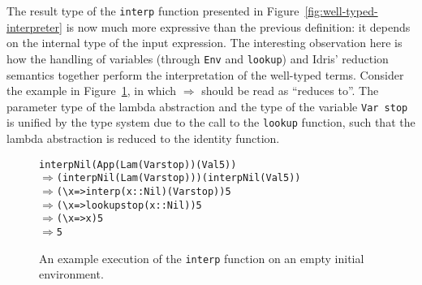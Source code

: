 The result type of the \texttt{interp} function presented in Figure~\ref{fig:well-typed-interpreter} is now much more expressive than the previous definition: it depends on the internal type of the input expression. The interesting observation here is how the handling of variables (through \texttt{Env} and \texttt{lookup}) and Idris' reduction semantics together perform the interpretation of the well-typed terms. Consider the example in Figure~\ref{fig:well-typed-interpreter-example}, in which $\Rightarrow$ should be read as ``reduces to''. The parameter type of the lambda abstraction and the type of the variable \texttt{Var stop} is unified by the type system due to the call to the \texttt{lookup} function, such that the lambda abstraction is reduced to the identity function.

\begin{figure}
\begin{alltt}
interp Nil (App (Lam (Var stop)) (Val 5))
\(\Rightarrow\) (interp Nil (Lam (Var stop))) (interp Nil (Val 5))
\(\Rightarrow\) (\textbackslash{x} => interp (x :: Nil) (Var stop)) 5
\(\Rightarrow\) (\textbackslash{x} => lookup stop (x :: Nil)) 5
\(\Rightarrow\) (\textbackslash{x} => x) 5
\(\Rightarrow\) 5
\end{alltt}
\caption{An example execution of the \texttt{interp} function on an empty initial environment.}
\label{fig:well-typed-interpreter-example}
\end{figure}

